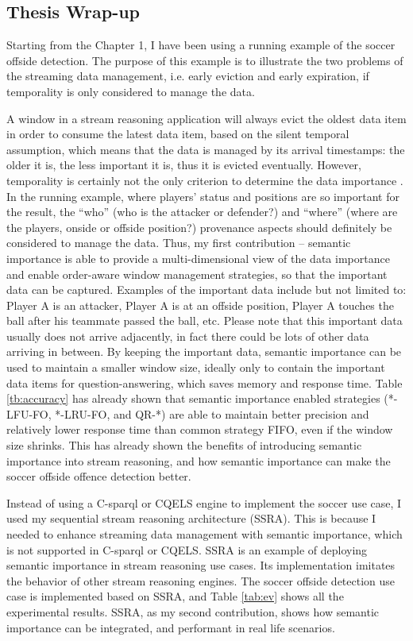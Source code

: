\subsection{Thesis Wrap-up}

Starting from the Chapter 1, I have been using a running example of the soccer offside detection.
The purpose of this example is to illustrate the two problems of the streaming data management, i.e. early eviction and early expiration, if temporality is only considered to manage the data.

A window in a stream reasoning application will always evict the oldest data item in order to consume the latest data item, based on the silent temporal assumption, which means that the data is managed by its arrival timestamps: the older it is, the less important it is, thus it is evicted eventually. 
However, temporality is certainly not the only criterion to determine the data importance . 
In the running example, where players' status and positions are so important for the result, the ``who'' (who is
the attacker or defender?) and ``where'' (where are the players, onside or offside position?) provenance aspects should definitely be considered to manage the data. 
Thus, my first contribution -- semantic importance is able to provide a multi-dimensional view of the data importance and enable order-aware window management strategies, so that the important data can be captured.
Examples of the important data include but not limited to: Player A is an attacker, Player A is at an offside position, Player A touches the ball after his teammate passed the ball, etc. 
Please note that this important data usually does not arrive adjacently, in fact there could be lots of other data arriving in between.
By keeping the important data, semantic importance can be used to maintain a smaller window size, ideally only to contain the important data items for question-answering, which saves memory and response time.
Table \ref{tb:accuracy} has already shown that semantic importance enabled strategies (*-LFU-FO, *-LRU-FO, and QR-*) are able to maintain better precision and relatively lower response time than common strategy FIFO, even if the window size shrinks.
This has already shown the benefits of introducing semantic importance into stream reasoning, and how semantic importance can make the soccer offside offence detection better.

Instead of using a C-sparql or CQELS engine to implement the soccer use case, I used my sequential stream reasoning architecture (SSRA).
This is because I needed to enhance streaming data management with semantic importance, which is not supported in C-sparql or CQELS. 
SSRA is an example of deploying semantic importance in stream reasoning use cases. 
Its implementation imitates the behavior of other stream reasoning engines.
The soccer offside detection use case is implemented based on SSRA, and Table \ref{tab:ev} shows all the experimental results.
SSRA, as my second contribution, shows how semantic importance can be integrated, and performant in real life scenarios. 


